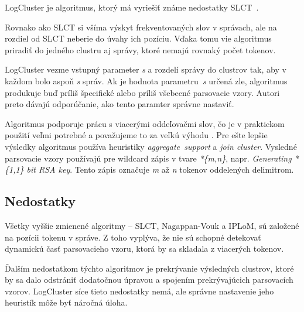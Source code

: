 LogCluster je algoritmus, ktorý má vyriešiť známe nedostatky SLCT~\parencite{logcluster}.
\par Rovnako ako SLCT si všíma výskyt frekventovaných slov v správach, ale na rozdiel od SLCT neberie do úvahy ich pozíciu. Vďaka tomu vie algoritmus priradiť do jedného clustru aj správy, ktoré nemajú rovnaký počet tokenov.
\par LogCluster vezme vstupný parameter \emph{s} a rozdelí správy do clustrov tak, aby v každom bolo aspoň \emph{s} správ. Ak je hodnota parametru~\emph{s} určená zle, algoritmus produkuje buď príliš špecifické alebo príliš všebecné parsovacie vzory. Autori preto dávajú odporúčanie, ako tento paramter správne nastaviť.
\par Algoritmus podporuje prácu s viacerými oddeľovačmi slov, čo je v praktickom použití veľmi potrebné a považujeme to za veľkú výhodu \parencite{logclustertool}. Pre ešte lepšie výsledky algoritmus používa heuristiky \emph{aggregate\, support} a \emph{join cluster}. Vysledné parsovacie vzory používajú pre wildcard zápis v tvare \emph{*\{m,n\}}, napr. \emph{Generating *\{1,1\} bit RSA key}. Tento zápis označuje \emph{m} až \emph{n} tokenov oddelených delimitrom.


\subsection{Nedostatky}
Všetky vyššie zmienené algoritmy -- SLCT, Nagappan-Vouk a IPLoM, sú založené na pozícii tokenu v správe. Z toho vyplýva, že nie sú schopné detekovať dynamickú časť parsovacieho vzoru, ktorá by sa skladala z viacerých tokenov.
\par Ďalším nedostatkom týchto algoritmov je prekrývanie výsledných clustrov, ktoré by sa dalo odstrániť dodatočnou úpravou a spojením prekrývajúcich parsovacích vzorov. LogCluster síce tieto nedostatky nemá, ale správne nastavenie jeho heuristík môže byť náročná úloha.